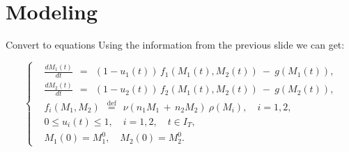 \documentclass{beamer}
\begin{document}
\section{Modeling}

\begin{frame}{Convert to equations}
    Using the information from the previous slide we can get:
    
    $$ 
    \left\{ \begin{aligned}
    & \frac{d M_1(t)}{dt} \:\: = \:\: (1 - u_1(t)) \, f_1(M_1(t), M_2(t)) \: - \: g(M_1(t)), \\
    & \frac{d M_2(t)}{dt} \:\: = \:\: (1 - u_2(t)) \, f_2(M_1(t), M_2(t)) \: - \: g(M_2(t)), \\
    & f_i(M_1, M_2) \:\: \stackrel{\mathrm{def}}{=} \:\: \nu(n_1 M_1 \, + \, n_2 M_2) \: \rho(M_i), \quad i = 1,2, \\
    & 0 \leqslant u_i(t) \leqslant 1, \quad i = 1,2, \quad t \in I_T, \\
    & M_1(0) = M_1^0, \quad M_2(0) = M_2^0.
    \end{aligned} \right.
    $$
\end{frame}
\end{document}
